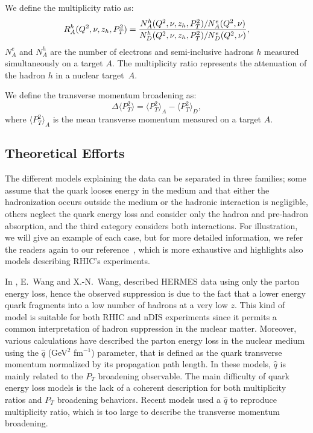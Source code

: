 We define the multiplicity ratio as:
\begin{equation}
R_A^h (Q^2,\nu,z_h,P_T^2) = {{N_A^h (Q^2,\nu,z_h,P_T^2) / N_A^e (Q^2,\nu)} 
                       \over {N_D^h (Q^2,\nu,z_h,P_T^2) / N_D^e (Q^2,\nu)}},
\end{equation}
$N^e_A$ and $N_A^h$ are the number of electrons and semi-inclusive hadrons $h$ measured simultaneously on a target $A$. The multiplicity ratio represents the attenuation of the hadron $h$ in a nuclear target~$A$.
\newline

We define the transverse momentum broadening as:
\begin{equation}
\Delta \langle P_T^2 \rangle = \langle P_T^2 \rangle_A - \langle P_T^2 \rangle_D,
\end{equation}
where $\langle P_T^2 \rangle_A$ is the mean transverse momentum measured on a target $A$.


\subsection{Theoretical Efforts}
\label{sec:theo}

The different models explaining the data can be separated in three families;
some assume that the quark looses energy in the medium and that either the hadronization occurs outside the medium or the hadronic interaction is 
negligible, others neglect the quark energy loss and consider
only the hadron and pre-hadron absorption, and the third category considers both
interactions. For illustration, we will give an example of each case, but for more detailed information, we refer the readers again to our reference~\cite{Accardi:2009qv}, which is more exhaustive and highlights also models describing RHIC's experiments.

In \cite{Wang:2002ri}, E.~Wang and X.-N.~Wang, described HERMES data using only 
the parton energy loss, hence the observed suppression is due to the fact that a lower energy quark fragments into a low number of hadrons at a very low $z$. This kind of model is suitable for both RHIC and nDIS experiments since it permits a common interpretation of hadron suppression in the nuclear matter. Moreover, various calculations have described the parton energy loss in the nuclear medium using the $\hat q$ (GeV$^2$ fm$^{-1}$) parameter, that is defined as the quark transverse momentum normalized by its propagation path length. In these models, $\hat q$ is mainly related to the $P_T$ broadening observable. The main difficulty of quark energy loss models is the lack of a coherent description for both multiplicity ratios and $P_T$ broadening behaviors. Recent models used a $\hat q$ to reproduce multiplicity ratio, which is too large to describe the transverse momentum broadening.

